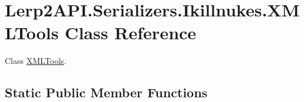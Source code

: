 \hypertarget{class_lerp2_a_p_i_1_1_serializers_1_1_ikillnukes_1_1_x_m_l_tools}{}\section{Lerp2\+A\+P\+I.\+Serializers.\+Ikillnukes.\+X\+M\+L\+Tools Class Reference}
\label{class_lerp2_a_p_i_1_1_serializers_1_1_ikillnukes_1_1_x_m_l_tools}


Class \hyperlink{class_lerp2_a_p_i_1_1_serializers_1_1_ikillnukes_1_1_x_m_l_tools}{X\+M\+L\+Tools}.  


\subsection*{Static Public Member Functions}
